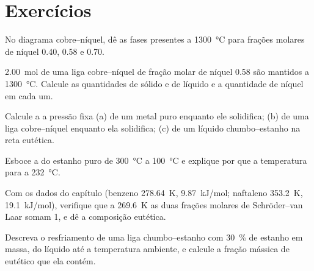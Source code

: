 \section{Exercícios}

\begin{exercise}[$\star$]\label{exo:b2:solid-liquid-diagrams:1}
No diagrama cobre--níquel, dê as fases presentes a
\qty{1300}{\degreeCelsius} para frações molares de níquel 0.40, 0.58 e 0.70.
\end{exercise}

\begin{exercise}[$\star$]\label{exo:b2:solid-liquid-diagrams:2}
\qty{2.00}{mol} de uma liga cobre--níquel de fração molar de níquel 0.58 são
mantidos a \qty{1300}{\degreeCelsius}. Calcule as quantidades de sólido e de
líquido e a quantidade de níquel em cada um.
\end{exercise}

\begin{exercise}[$\star$]\label{exo:b2:solid-liquid-diagrams:3}
Calcule a  a pressão fixa (a) de um metal puro enquanto ele
solidifica; (b) de uma liga cobre--níquel enquanto ela solidifica; (c) de um
líquido chumbo--estanho na reta eutética.
\end{exercise}

\begin{exercise}[$\star$]\label{exo:b2:solid-liquid-diagrams:4}
Esboce a  do estanho puro de \qty{300}{\degreeCelsius} a
\qty{100}{\degreeCelsius} e explique por que a temperatura para a
\qty{232}{\degreeCelsius}.
\end{exercise}

\begin{exercise}[$\star\star$]\label{exo:b2:solid-liquid-diagrams:5}
Com os dados do capítulo (benzeno \qty{278.64}{K}, \qty{9.87}{kJ/mol};
naftaleno \qty{353.2}{K}, \qty{19.1}{kJ/mol}), verifique que a
\qty{269.6}{K} as duas frações molares de Schröder--van Laar somam 1, e dê
a composição eutética.
\end{exercise}

\begin{exercise}[$\star\star$]\label{exo:b2:solid-liquid-diagrams:6}
Descreva o resfriamento de uma liga chumbo--estanho com 30~\% de estanho em
massa, do líquido até a temperatura ambiente, e calcule a fração mássica de
eutético que ela contém.
\end{exercise}

